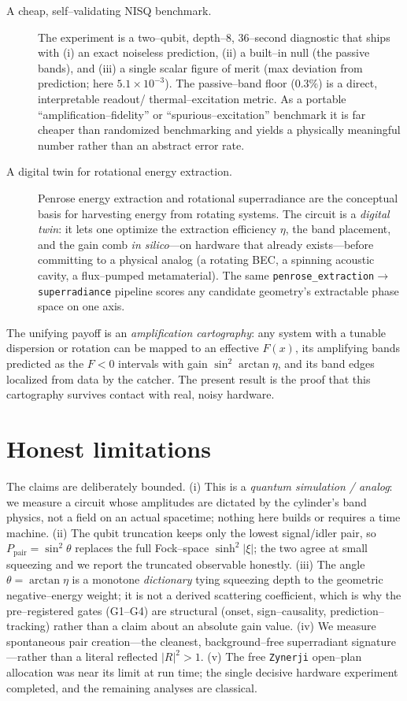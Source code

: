 \documentclass[11pt]{article}
\newcommand{\Ppair}{P_{\mathrm{pair}}}
\newcommand{\code}[1]{\texttt{\small #1}}
\begin{document}
\begin{description}
\item[A cheap, self--validating NISQ benchmark.] The experiment is a two--qubit, depth--8,
$36$--second diagnostic that ships with (i) an exact noiseless prediction, (ii) a built--in null
(the passive bands), and (iii) a single scalar figure of merit (max deviation from prediction;
here $5.1\times10^{-3}$). The passive--band floor ($0.3\%$) is a direct, interpretable readout/
thermal--excitation metric. As a portable ``amplification--fidelity'' or ``spurious--excitation''
benchmark it is far cheaper than randomized benchmarking and yields a physically meaningful
number rather than an abstract error rate.

\item[A digital twin for rotational energy extraction.] Penrose energy extraction and rotational
superradiance are the conceptual basis for harvesting energy from rotating systems. The circuit
is a \emph{digital twin}: it lets one optimize the extraction efficiency $\eta$, the band
placement, and the gain comb \emph{in silico}---on hardware that already exists---before
committing to a physical analog (a rotating BEC, a spinning acoustic cavity, a flux--pumped
metamaterial). The same \code{penrose\_extraction}$\to$\code{superradiance} pipeline scores any
candidate geometry's extractable phase space on one axis.
\end{description}

The unifying payoff is an \emph{amplification cartography}: any system with a tunable dispersion
or rotation can be mapped to an effective $F(x)$, its amplifying bands predicted as the $F<0$
intervals with gain $\sin^2\!\arctan\eta$, and its band edges localized from data by the catcher.
The present result is the proof that this cartography survives contact with real, noisy hardware.

\section{Honest limitations}

The claims are deliberately bounded. (i) This is a \emph{quantum simulation / analog}: we measure
a circuit whose amplitudes are dictated by the cylinder's band physics, not a field on an actual
spacetime; nothing here builds or requires a time machine. (ii) The qubit truncation keeps only
the lowest signal/idler pair, so $\Ppair=\sin^2\theta$ replaces the full Fock--space
$\sinh^2|\xi|$; the two agree at small squeezing and we report the truncated observable honestly.
(iii) The angle $\theta=\arctan\eta$ is a monotone \emph{dictionary} tying squeezing depth to the
geometric negative--energy weight; it is not a derived scattering coefficient, which is why the
pre--registered gates (G1--G4) are structural (onset, sign--causality, prediction--tracking)
rather than a claim about an absolute gain value. (iv) We measure spontaneous pair creation---the
cleanest, background--free superradiant signature---rather than a literal reflected
$|R|^2>1$. (v) The free \code{Zynerji} open--plan allocation was near its limit at run time; the
single decisive hardware experiment completed, and the remaining analyses are classical.
\end{document}
